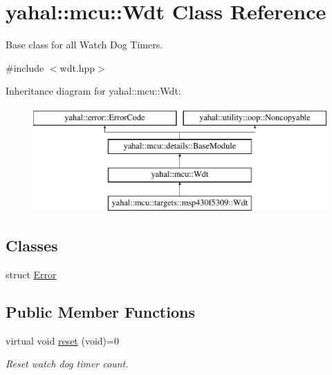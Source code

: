 \hypertarget{classyahal_1_1mcu_1_1_wdt}{}\section{yahal\+:\+:mcu\+:\+:Wdt Class Reference}
\label{classyahal_1_1mcu_1_1_wdt}


Base class for all Watch Dog Timers.  




{\ttfamily \#include $<$wdt.\+hpp$>$}

Inheritance diagram for yahal\+:\+:mcu\+:\+:Wdt\+:\begin{figure}[H]
\begin{center}
\leavevmode
\includegraphics[height=4.000000cm]{classyahal_1_1mcu_1_1_wdt}
\end{center}
\end{figure}
\subsection*{Classes}
\begin{DoxyCompactItemize}
\item 
struct \hyperlink{structyahal_1_1mcu_1_1_wdt_1_1_error}{Error}
\end{DoxyCompactItemize}
\subsection*{Public Member Functions}
\begin{DoxyCompactItemize}
\item 
\hypertarget{classyahal_1_1mcu_1_1_wdt_a147a40273f928037437c8fefa58ed388}{}virtual void \hyperlink{classyahal_1_1mcu_1_1_wdt_a147a40273f928037437c8fefa58ed388}{reset} (void)=0\label{classyahal_1_1mcu_1_1_wdt_a147a40273f928037437c8fefa58ed388}

\begin{DoxyCompactList}\small\item\em Reset watch dog timer count. \end{DoxyCompactList}\end{DoxyCompactItemize}

